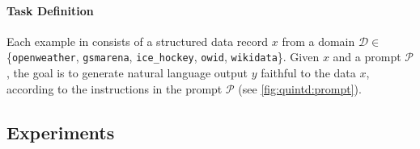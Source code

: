 \paragraph{Task Definition}
Each example in \benchmark{} consists of a structured data record $x$ from a domain $\mathcal{D} \in $ \{\texttt{openweather}, \texttt{gsmarena}, \texttt{ice\_hockey}, \texttt{owid}, \texttt{wikidata}\}. Given $x$ and a prompt $\mathcal{P}$, the goal is to generate natural language output $y$ faithful to the data $x$, according to the instructions in the prompt $\mathcal{P}$ (see \autoref{fig:quintd:prompt}).







\subsection{Experiments}
\label{sec:quintd:experiments}

